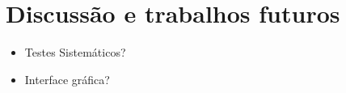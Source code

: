 \chapter{Discussão e trabalhos futuros}
\label{cap:discussao}

\begin{itemize}
\item Testes Sistemáticos?
\item Interface gráfica?
\end{itemize}
